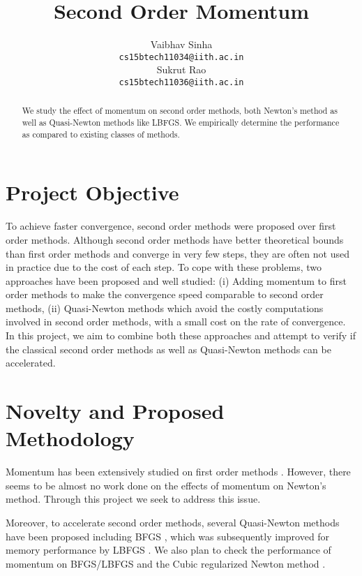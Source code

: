 \documentclass{article}
\title{Second Order Momentum}
\author{
  Vaibhav Sinha \\
  \texttt{cs15btech11034@iith.ac.in} \\
  \And
  Sukrut Rao \\
  \texttt{cs15btech11036@iith.ac.in} \\
}
\begin{document}
\maketitle

\begin{abstract}
  We study the effect of momentum on second order methods, both Newton's method as well as Quasi-Newton methods like LBFGS. We empirically determine the performance as compared to existing classes of methods.
\end{abstract}

\section{Project Objective}

To achieve faster convergence, second order methods were proposed over first order methods. Although second order methods have better theoretical bounds than first order methods and converge in very few steps, they are often not used in practice due to the cost of each step. To cope with these problems, two approaches have been proposed and well studied: (i) Adding momentum \cite{POLYAK19641,Sutskever} to first order methods to make the convergence speed comparable to second order methods, (ii) Quasi-Newton methods \citep{davidon,broyden1965class,nocedal1980updating} which avoid the costly computations involved in second order methods, with a small cost on the rate of convergence. In this project, we aim to combine both these approaches and attempt to verify if the classical second order methods as well as Quasi-Newton methods can be accelerated.

\section{Novelty and Proposed Methodology}

Momentum has been extensively studied on first order methods \citep{POLYAK19641,Sutskever}. However, there seems to be almost no work done on the effects of momentum on Newton’s method. Through this project we seek to address this issue.

Moreover, to accelerate second order methods, several Quasi-Newton methods have been proposed including BFGS \citep{broyden1965class}, which was subsequently improved for memory performance by LBFGS \citep{nocedal1980updating}. We also plan to check the performance of momentum on BFGS/LBFGS and the Cubic regularized Newton method \citep{nesterov2006cubic}.
\end{document}
